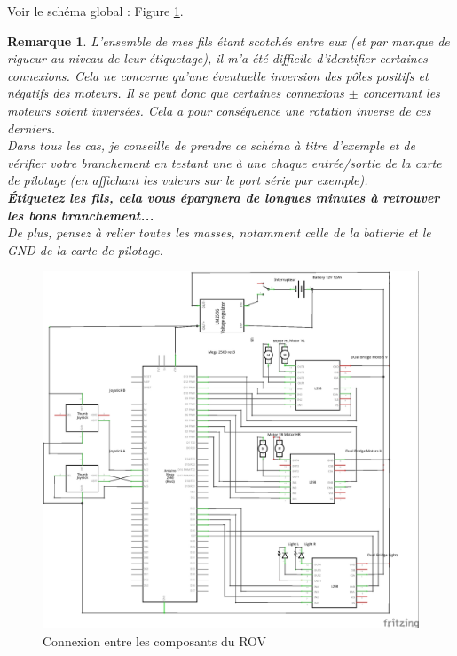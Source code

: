 \documentclass[11pt,a4paper]{article}
\newtheorem*{remarque*}{Remarque}
\begin{document}
        Voir le schéma global : Figure \ref{figConnexions}.
          \begin{remarque*}
            L'ensemble de mes fils étant scotchés entre eux (et par manque de rigueur au niveau de leur étiquetage), il m'a été difficile d'identifier certaines connexions. Cela ne concerne qu'une éventuelle inversion des pôles positifs et négatifs des moteurs. Il se peut donc que certaines connexions $\pm$ concernant les moteurs soient inversées. Cela a pour conséquence une rotation inverse de ces derniers. \\
            Dans tous les cas, je conseille de prendre ce schéma à titre d'exemple et de vérifier votre branchement en testant une à une chaque entrée/sortie de la carte de pilotage (en affichant les valeurs sur le port série par exemple).\\
            \textbf{Étiquetez les fils, cela vous épargnera de longues minutes à retrouver les bons branchement...}\\
            De plus, pensez à relier toutes les masses, notamment celle de la batterie et le GND de la carte de pilotage.
          \end{remarque*}

          \begin{figure}[H]
            \centering
            \includegraphics[scale=0.9]{schemaROV.jpg}
            \caption{Connexion entre les composants du ROV}
            \label{figConnexions}
          \end{figure}
\end{document}
